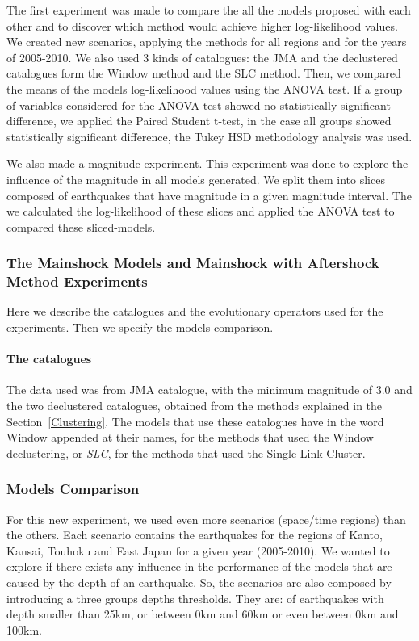The first experiment was made to compare the all the models proposed with each other and to discover which method would achieve higher log-likelihood values. We created new scenarios, applying the methods for all regions and for the years of 2005-2010. We also used 3 kinds of catalogues: the JMA and the declustered catalogues form the Window method and the SLC method. Then, we compared the means of the models log-likelihood values using the ANOVA test. If a group of variables considered for the ANOVA test showed no statistically significant difference, we applied the Paired Student t-test, in the case all groups showed statistically significant difference, the Tukey HSD methodology analysis was used.

We also made a magnitude experiment. This experiment was done to explore the influence of the magnitude in all models generated. We split them into slices composed of earthquakes that have magnitude in a given magnitude interval. The we calculated the log-likelihood of these slices and applied the ANOVA test to compared these sliced-models.


\subsubsection{The Mainshock Models and Mainshock with Aftershock Method Experiments}\label{bigExp}
 Here we describe the catalogues and the evolutionary operators used for the experiments. Then we specify the models comparison.
 
\paragraph{The catalogues}\label{catalogs}

The data used was from JMA catalogue, with the minimum magnitude of 3.0 and the two declustered catalogues, obtained from the methods explained in the Section~\ref{Clustering}. The models that use these catalogues have in the word Window appended at their names, for the methods that used the Window declustering, or \textit{SLC}, for the methods that used the Single Link Cluster. 

\subsubsection{Models Comparison}
For this new experiment, we used even more scenarios (space/time regions) than the others. Each scenario contains the earthquakes for the regions of Kanto, Kansai, Touhoku and East Japan for a given year (2005-2010). We wanted to explore if there exists any influence in the performance of the models that are caused by the depth of an earthquake. So, the scenarios are also composed by introducing a three groups depths thresholds. They are: of earthquakes with depth smaller than 25km, or between 0km and 60km or even between 0km and 100km.

